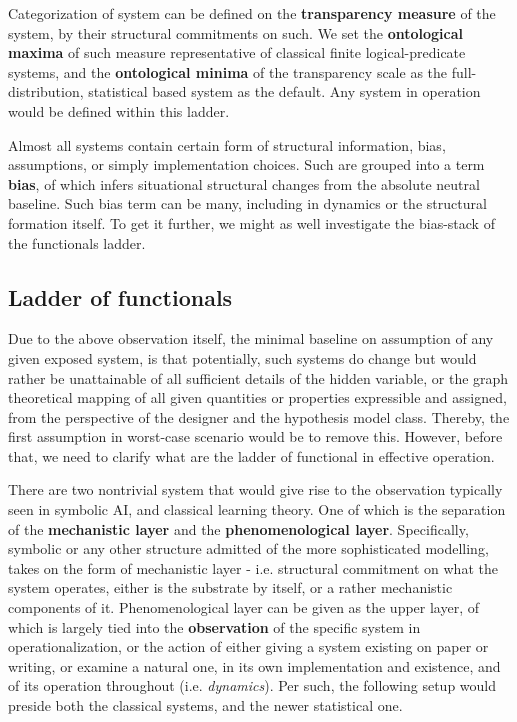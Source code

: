 \begin{definition}
    Categorization of system can be defined on the \textbf{transparency measure} of the system, by their structural commitments on such. We set the \textbf{ontological maxima} of such measure representative of classical finite logical-predicate systems, and the \textbf{ontological minima} of the transparency scale as the full-distribution, statistical based system as the default. Any system in operation would be defined within this ladder. 
\end{definition}

Almost all systems contain certain form of structural information, bias, assumptions, or simply implementation choices. Such are grouped into a term \textbf{bias}, of which infers situational structural changes from the absolute neutral baseline. Such bias term can be many, including in dynamics or the structural formation itself. To get it further, we might as well investigate the bias-stack of the functionals ladder. 

\subsection{Ladder of functionals}

Due to the above observation itself, the minimal baseline on assumption of any given exposed system, is that potentially, such systems do change but would rather be unattainable of all sufficient details of the hidden variable, or the graph theoretical mapping of all given quantities or properties expressible and assigned, from the perspective of the designer and the hypothesis model class. Thereby, the first assumption in worst-case scenario would be to remove this. However, before that, we need to clarify what are the ladder of functional in effective operation. 

There are two nontrivial system that would give rise to the observation typically seen in symbolic AI, and classical learning theory. One of which is the separation of the \textbf{mechanistic layer} and the \textbf{phenomenological layer}. Specifically, symbolic or any other structure admitted of the more sophisticated modelling, takes on the form of mechanistic layer - i.e. structural commitment on what the system operates, either is the substrate by itself, or a rather mechanistic components of it. Phenomenological layer can be given as the upper layer, of which is largely tied into the \textbf{observation} of the specific system in operationalization, or the action of either giving a system existing on paper or writing, or examine a natural one, in its own implementation and existence, and of its operation throughout (i.e. \textit{dynamics}). Per such, the following setup would preside both the classical systems, and the newer statistical one. 

